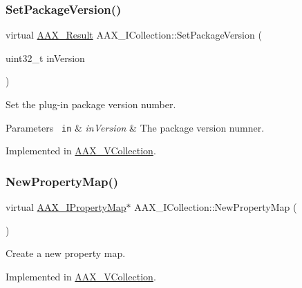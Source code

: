 \subsubsection{\texorpdfstring{SetPackageVersion()}{SetPackageVersion()}}
{\footnotesize\ttfamily virtual \mbox{\hyperlink{a00392_a4d8f69a697df7f70c3a8e9b8ee130d2f}{A\+A\+X\+\_\+\+Result}} A\+A\+X\+\_\+\+I\+Collection\+::\+Set\+Package\+Version (\begin{DoxyParamCaption}\item[{uint32\+\_\+t}]{in\+Version }\end{DoxyParamCaption})\hspace{0.3cm}{\ttfamily [pure virtual]}}



Set the plug-\/in package version number. 


\begin{DoxyParams}[1]{Parameters}
\mbox{\texttt{ in}}  & {\em in\+Version} & The package version numner. \\
\hline
\end{DoxyParams}


Implemented in \mbox{\hyperlink{a01897_a8c070ce17b8af89de1fbf543d746635c}{A\+A\+X\+\_\+\+V\+Collection}}.

\mbox{\label{a01777_a665bac1e4e4558e0998d15a030a57407}} 
\subsubsection{\texorpdfstring{NewPropertyMap()}{NewPropertyMap()}}
{\footnotesize\ttfamily virtual \mbox{\hyperlink{a01869}{A\+A\+X\+\_\+\+I\+Property\+Map}}$\ast$ A\+A\+X\+\_\+\+I\+Collection\+::\+New\+Property\+Map (\begin{DoxyParamCaption}{ }\end{DoxyParamCaption})\hspace{0.3cm}{\ttfamily [pure virtual]}}



Create a new property map. 



Implemented in \mbox{\hyperlink{a01897_a564f2e0d4530e17e135c7b011c9bd3d8}{A\+A\+X\+\_\+\+V\+Collection}}.

\mbox{\label{a01777_a0cbb609eec2550f7db3a137a826ec436}} 
